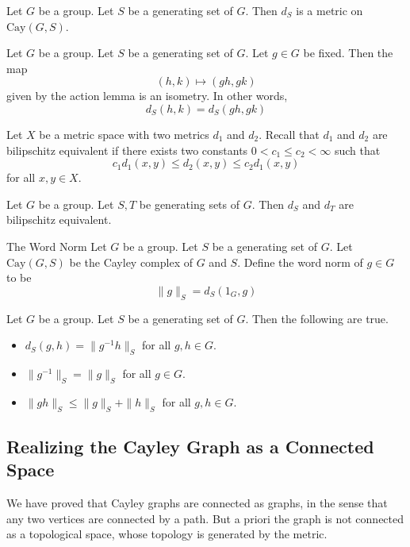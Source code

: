 \documentclass[a4paper]{article}
\begin{document}
\begin{lmm}{}{} Let $G$ be a group. Let $S$ be a generating set of $G$. Then $d_S$ is a metric on $\text{Cay}(G,S)$. 
\end{lmm}

\begin{prp}{}{} Let $G$ be a group. Let $S$ be a generating set of $G$. Let $g\in G$ be fixed. Then the map $$(h,k)\mapsto(gh,gk)$$ given by the action lemma is an isometry. In other words, $$d_S(h,k)=d_S(gh,gk)$$
\end{prp}

Let $X$ be a metric space with two metrics $d_1$ and $d_2$. Recall that $d_1$ and $d_2$ are bilipschitz equivalent if there exists two constants $0<c_1\leq c_2<\infty$ such that $$c_1d_1(x,y)\leq d_2(x,y)\leq c_2d_1(x,y)$$ for all $x,y\in X$. 

\begin{lmm}{}{} Let $G$ be a group. Let $S,T$ be generating sets of $G$. Then $d_S$ and $d_T$ are bilipschitz equivalent. 
\end{lmm}

\begin{defn}{The Word Norm}{} Let $G$ be a group. Let $S$ be a generating set of $G$. Let $\text{Cay}(G,S)$ be the Cayley complex of $G$ and $S$. Define the word norm of $g\in G$ to be $$\|g\|_S=d_S(1_G,g)$$
\end{defn}

\begin{lmm}{}{} Let $G$ be a group. Let $S$ be a generating set of $G$. Then the following are true. 
\begin{itemize}
\item $d_S(g,h)=\|g^{-1}h\|_S$ for all $g,h\in G$. 
\item $\|g^{-1}\|_S=\|g\|_S$ for all $g\in G$. 
\item $\|gh\|_S\leq\|g\|_S+\|h\|_S$ for all $g,h\in G$. 
\end{itemize}
\end{lmm}

\subsection{Realizing the Cayley Graph as a Connected Space}
We have proved that Cayley graphs are connected as graphs, in the sense that any two vertices are connected by a path. But a priori the graph is not connected as a topological space, whose topology is generated by the metric. 
\end{document}
